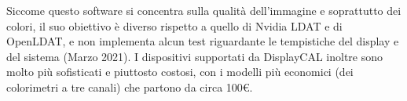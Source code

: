 Siccome questo software si concentra sulla qualità dell'immagine e soprattutto dei colori, il suo obiettivo è diverso rispetto a quello di Nvidia LDAT e di OpenLDAT, e non implementa alcun test riguardante le tempistiche del display e del sistema (Marzo 2021). I dispositivi supportati da DisplayCAL inoltre sono molto più sofisticati e piuttosto costosi, con i modelli più economici (dei colorimetri a tre canali) che partono da circa 100€.
